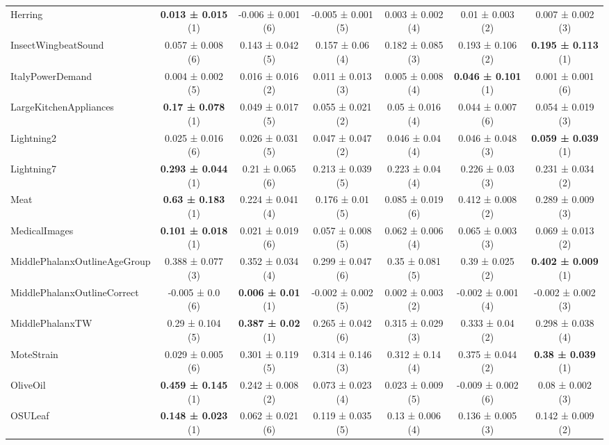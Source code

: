 \begin{table}[ht]
\begin{adjustbox}{width=\textwidth}
\begin{tabular}{lcccccc}
    Herring & \textbf{0.013 ± 0.015} (1) & -0.006 ± 0.001 (6) & -0.005 ± 0.001 (5) & 0.003 ± 0.002 (4) & 0.01 ± 0.003 (2) & 0.007 ± 0.002 (3) \\
    InsectWingbeatSound & 0.057 ± 0.008 (6) & 0.143 ± 0.042 (5) & 0.157 ± 0.06 (4) & 0.182 ± 0.085 (3) & 0.193 ± 0.106 (2) & \textbf{0.195 ± 0.113} (1) \\
    ItalyPowerDemand & 0.004 ± 0.002 (5) & 0.016 ± 0.016 (2) & 0.011 ± 0.013 (3) & 0.005 ± 0.008 (4) & \textbf{0.046 ± 0.101} (1) & 0.001 ± 0.001 (6) \\
    LargeKitchenAppliances & \textbf{0.17 ± 0.078} (1) & 0.049 ± 0.017 (5) & 0.055 ± 0.021 (2) & 0.05 ± 0.016 (4) & 0.044 ± 0.007 (6) & 0.054 ± 0.019 (3) \\
    Lightning2 & 0.025 ± 0.016 (6) & 0.026 ± 0.031 (5) & 0.047 ± 0.047 (2) & 0.046 ± 0.04 (4) & 0.046 ± 0.048 (3) & \textbf{0.059 ± 0.039} (1) \\
    Lightning7 & \textbf{0.293 ± 0.044} (1) & 0.21 ± 0.065 (6) & 0.213 ± 0.039 (5) & 0.223 ± 0.04 (4) & 0.226 ± 0.03 (3) & 0.231 ± 0.034 (2) \\
    Meat & \textbf{0.63 ± 0.183} (1) & 0.224 ± 0.041 (4) & 0.176 ± 0.01 (5) & 0.085 ± 0.019 (6) & 0.412 ± 0.008 (2) & 0.289 ± 0.009 (3) \\
    MedicalImages & \textbf{0.101 ± 0.018} (1) & 0.021 ± 0.019 (6) & 0.057 ± 0.008 (5) & 0.062 ± 0.006 (4) & 0.065 ± 0.003 (3) & 0.069 ± 0.013 (2) \\
    MiddlePhalanxOutlineAgeGroup & 0.388 ± 0.077 (3) & 0.352 ± 0.034 (4) & 0.299 ± 0.047 (6) & 0.35 ± 0.081 (5) & 0.39 ± 0.025 (2) & \textbf{0.402 ± 0.009} (1) \\
    MiddlePhalanxOutlineCorrect & -0.005 ± 0.0 (6) & \textbf{0.006 ± 0.01} (1) & -0.002 ± 0.002 (5) & 0.002 ± 0.003 (2) & -0.002 ± 0.001 (4) & -0.002 ± 0.002 (3) \\
    MiddlePhalanxTW & 0.29 ± 0.104 (5) & \textbf{0.387 ± 0.02} (1) & 0.265 ± 0.042 (6) & 0.315 ± 0.029 (3) & 0.333 ± 0.04 (2) & 0.298 ± 0.038 (4) \\
    MoteStrain & 0.029 ± 0.005 (6) & 0.301 ± 0.119 (5) & 0.314 ± 0.146 (3) & 0.312 ± 0.14 (4) & 0.375 ± 0.044 (2) & \textbf{0.38 ± 0.039} (1) \\
    OliveOil & \textbf{0.459 ± 0.145} (1) & 0.242 ± 0.008 (2) & 0.073 ± 0.023 (4) & 0.023 ± 0.009 (5) & -0.009 ± 0.002 (6) & 0.08 ± 0.002 (3) \\
    OSULeaf & \textbf{0.148 ± 0.023} (1) & 0.062 ± 0.021 (6) & 0.119 ± 0.035 (5) & 0.13 ± 0.006 (4) & 0.136 ± 0.005 (3) & 0.142 ± 0.009 (2) \\

\end{tabular}
\end{adjustbox}
\end{table}
